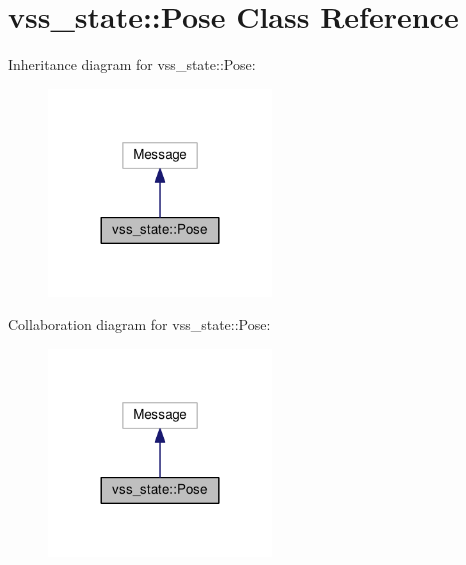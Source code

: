 \hypertarget{classvss__state_1_1Pose}{}\section{vss\+\_\+state\+:\+:Pose Class Reference}
\label{classvss__state_1_1Pose}


Inheritance diagram for vss\+\_\+state\+:\+:Pose\+:\nopagebreak
\begin{figure}[H]
\begin{center}
\leavevmode
\includegraphics[width=168pt]{classvss__state_1_1Pose__inherit__graph}
\end{center}
\end{figure}


Collaboration diagram for vss\+\_\+state\+:\+:Pose\+:\nopagebreak
\begin{figure}[H]
\begin{center}
\leavevmode
\includegraphics[width=168pt]{classvss__state_1_1Pose__coll__graph}
\end{center}
\end{figure}
